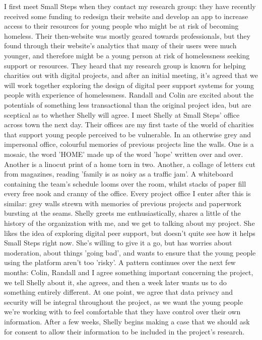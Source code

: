 I first meet Small Steps when they contact my research group: they have recently received some funding to redesign their website and develop an app to increase access to their resources for young people who might be at risk of becoming homeless. Their then-website was mostly geared towards professionals, but they found through their website's analytics that many of their users were much younger, and therefore might be a young person at risk of homelessness seeking support or resources. They heard that my research group is known for helping charities out with digital projects, and after an initial meeting, it's agreed that we will work together exploring the design of digital peer support systems for young people with experience of homelessness. Randall and Colin are excited about the potentials of something less transactional than the original project idea, but are sceptical as to whether Shelly will agree. 
I meet Shelly at Small Steps' office across town the next day. Their offices are my first taste of the world of charities that support young people perceived to be vulnerable. In an otherwise grey and impersonal office, colourful memories of previous projects line the walls. One is a mosaic, the word 'HOME' made up of the word 'hope' written over and over. Another is a linocut print of a home torn in two. Another, a collage of letters cut from magazines, reading 'family is as noisy as a traffic jam'. A whiteboard containing the team's schedule looms over the room, whilst stacks of paper fill every free nook and cranny of the office. Every project office I enter after this is similar: grey walls strewn with memories of previous projects and paperwork bursting at the seams. Shelly greets me enthusiastically, shares a little of the history of the organization with me, and we get to talking about my project. She likes the idea of exploring digital peer support, but doesn't quite see how it helps Small Steps right now. She's willing to give it a go, but has worries about moderation, about things 'going bad', and wants to ensure that the young people using the platform aren't too 'risky'. A pattern continues over the next few months: Colin, Randall and I agree something important concerning the project, we tell Shelly about it, she agrees, and then a week later wants us to do something entirely different. At one point, we agree that data privacy and security will be integral throughout the project, as we want the young people we're working with to feel comfortable that they have control over their own information. After a few weeks, Shelly begins making a case that we should ask for consent to allow their information to be included in the project's research. 

